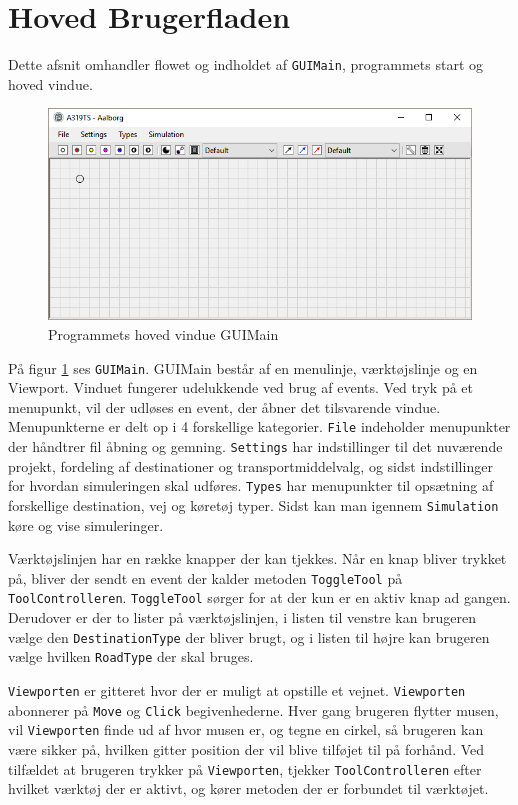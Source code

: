 \section{Hoved Brugerfladen}\label{HovedBrugerfladen}
Dette afsnit omhandler flowet og indholdet af \texttt{GUIMain}, programmets start og hoved vindue. 

\begin{figure}[!h]
    \centering
    \includegraphics[width=\textwidth,height=\textheight,keepaspectratio]{Pictures/Implementation/program}
    \caption{Programmets hoved vindue GUIMain}
    \label{a319program}
\end{figure}

På figur \ref{a319program} ses \texttt{GUIMain}. GUIMain består af en menulinje, værktøjslinje og en Viewport. Vinduet fungerer udelukkende ved brug af events. Ved tryk på et menupunkt, vil der udløses en event, der åbner det tilsvarende vindue. Menupunkterne er delt op i 4 forskellige kategorier. \texttt{File} indeholder menupunkter der håndtrer fil åbning og gemning. \texttt{Settings} har indstillinger til det nuværende projekt, fordeling af destinationer og transportmiddelvalg, og sidst indstillinger for hvordan simuleringen skal udføres. \texttt{Types} har menupunkter til opsætning af forskellige destination, vej og køretøj typer. Sidst kan man igennem \texttt{Simulation} køre og vise simuleringer.

\vspace{5mm}

Værktøjslinjen har en række knapper der kan tjekkes. Når en knap bliver trykket på, bliver der sendt en event der kalder metoden \texttt{ToggleTool} på \texttt{ToolControlleren}. \texttt{ToggleTool} sørger for at der kun er en aktiv knap ad gangen. Derudover er der to lister på værktøjslinjen, i listen til venstre kan brugeren vælge den \texttt{DestinationType} der bliver brugt, og i listen til højre kan brugeren vælge hvilken \texttt{RoadType} der skal bruges.

\vspace{5mm}

\texttt{Viewporten} er gitteret hvor der er muligt at opstille et vejnet. \texttt{Viewporten} abonnerer på \texttt{Move} og \texttt{Click} begivenhederne. Hver gang brugeren flytter musen, vil \texttt{Viewporten} finde ud af hvor musen er, og tegne en cirkel, så brugeren kan være sikker på, hvilken gitter position der vil blive tilføjet til på forhånd. Ved tilfældet at brugeren trykker på \texttt{Viewporten}, tjekker \texttt{ToolControlleren} efter hvilket værktøj der er aktivt, og kører metoden der er forbundet til værktøjet.
